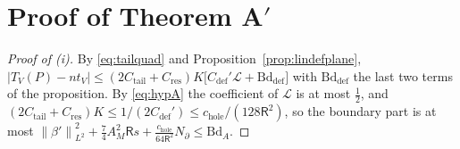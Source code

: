 \documentclass[11pt,reqno]{amsart}
\numberwithin{equation}{section}
\theoremstyle{plain}
\theoremstyle{definition}
\newcommand{\norm}[1]{\left\|#1\right\|}
\newcommand{\Cc}[1]{C_{\mathrm{#1}}}
\newcommand{\cL}{\mathcal{L}}
\newcommand{\fR}{\mathsf{R}}
\newcommand{\Bd}{\mathrm{Bd}}
\begin{document}
\section{Proof of Theorem A$'$}\label{sec:proofA}

\begin{proof}[Proof of (i)]
By \eqref{eq:tailquad} and Proposition~\ref{prop:lindefplane}, $|T_V(P)-nt_V|\le(2\Cc{tail}+\Cc{res})K\big[\Cc{def}'\cL+\mathrm{Bd}_{\mathrm{def}}\big]$ with $\mathrm{Bd}_{\mathrm{def}}$ the last two terms of the proposition.  By \eqref{eq:hypA} the coefficient of $\cL$ is at most $\frac12$, and $(2\Cc{tail}+\Cc{res})K\le1/(2\Cc{def}')\le c_{\mathrm{hole}}/(128\fR^2)$, so the boundary part is at most $\norm{\beta'}^2_{L^2}+\frac74A_M^2\fR s+\frac{c_{\mathrm{hole}}}{64\fR^2}N_\partial\le\Bd_A$.
\end{proof}
\end{document}

